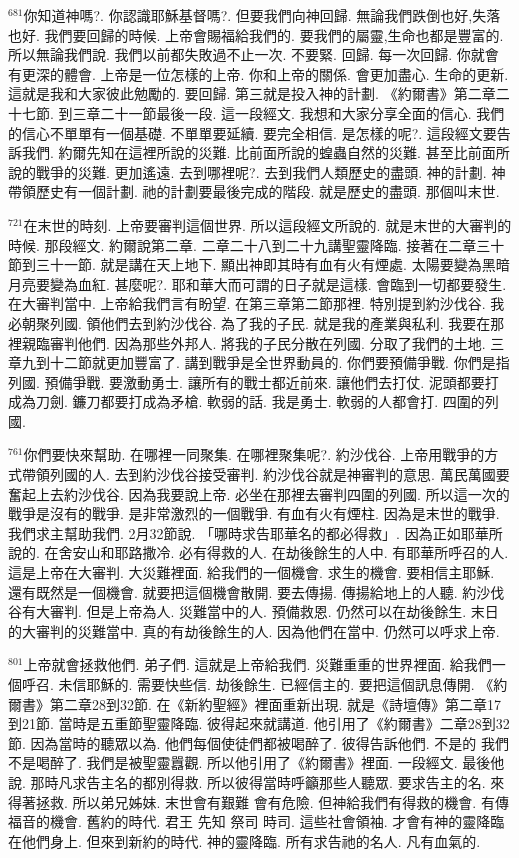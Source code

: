 \documentclass{book}
\begin{document}
$^{681}$你知道神嗎?.
你認識耶穌基督嗎?.
但要我們向神回歸.
無論我們跌倒也好,失落也好.
我們要回歸的時候.
上帝會賜福給我們的.
要我們的屬靈,生命也都是豐富的.
所以無論我們說.
我們以前都失敗過不止一次.
不要緊.
回歸.
每一次回歸.
你就會有更深的體會.
上帝是一位怎樣的上帝.
你和上帝的關係.
會更加盡心.
生命的更新.
這就是我和大家彼此勉勵的.
要回歸.
第三就是投入神的計劃.
《約爾書》第二章二十七節.
到三章二十一節最後一段.
這一段經文.
我想和大家分享全面的信心.
我們的信心不單單有一個基礎.
不單單要延續.
要完全相信.
是怎樣的呢?.
這段經文要告訴我們.
約爾先知在這裡所說的災難.
比前面所說的蝗蟲自然的災難.
甚至比前面所說的戰爭的災難.
更加遙遠.
去到哪裡呢?.
去到我們人類歷史的盡頭.
神的計劃.
神帶領歷史有一個計劃.
祂的計劃要最後完成的階段.
就是歷史的盡頭.
那個叫末世.

$^{721}$在末世的時刻.
上帝要審判這個世界.
所以這段經文所說的.
就是末世的大審判的時候.
那段經文.
約爾說第二章.
二章二十八到二十九講聖靈降臨.
接著在二章三十節到三十一節.
就是講在天上地下.
顯出神即其時有血有火有煙處.
太陽要變為黑暗月亮要變為血紅.
甚麼呢?.
耶和華大而可謂的日子就是這樣.
會臨到一切都要發生.
在大審判當中.
上帝給我們言有盼望.
在第三章第二節那裡.
特別提到約沙伐谷.
我必朝聚列國.
領他們去到約沙伐谷.
為了我的子民.
就是我的產業與私利.
我要在那裡親臨審判他們.
因為那些外邦人.
將我的子民分散在列國.
分取了我們的土地.
三章九到十二節就更加豐富了.
講到戰爭是全世界動員的.
你們要預備爭戰.
你們是指列國.
預備爭戰.
要激動勇士.
讓所有的戰士都近前來.
讓他們去打仗.
泥頭都要打成為刀劍.
鐮刀都要打成為矛槍.
軟弱的話.
我是勇士.
軟弱的人都會打.
四圍的列國.

$^{761}$你們要快來幫助.
在哪裡一同聚集.
在哪裡聚集呢?.
約沙伐谷.
上帝用戰爭的方式帶領列國的人.
去到約沙伐谷接受審判.
約沙伐谷就是神審判的意思.
萬民萬國要奮起上去約沙伐谷.
因為我要說上帝.
必坐在那裡去審判四圍的列國.
所以這一次的戰爭是沒有的戰爭.
是非常激烈的一個戰爭.
有血有火有煙柱.
因為是末世的戰爭.
我們求主幫助我們.
2月32節說.
「哪時求告耶華名的都必得救」.
因為正如耶華所說的.
在舍安山和耶路撒冷.
必有得救的人.
在劫後餘生的人中.
有耶華所呼召的人.
這是上帝在大審判.
大災難裡面.
給我們的一個機會.
求生的機會.
要相信主耶穌.
還有既然是一個機會.
就要把這個機會散開.
要去傳揚.
傳揚給地上的人聽.
約沙伐谷有大審判.
但是上帝為人.
災難當中的人.
預備救恩.
仍然可以在劫後餘生.
末日的大審判的災難當中.
真的有劫後餘生的人.
因為他們在當中.
仍然可以呼求上帝.

$^{801}$上帝就會拯救他們.
弟子們.
這就是上帝給我們.
災難重重的世界裡面.
給我們一個呼召.
未信耶穌的.
需要快些信.
劫後餘生.
已經信主的.
要把這個訊息傳開.
《約爾書》第二章28到32節.
在《新約聖經》裡面重新出現.
就是《詩壇傳》第二章17到21節.
當時是五重節聖靈降臨.
彼得起來就講道.
他引用了《約爾書》二章28到32節.
因為當時的聽眾以為.
他們每個使徒們都被喝醉了.
彼得告訴他們.
不是的 我們不是喝醉了.
我們是被聖靈囂觀.
所以他引用了《約爾書》裡面.
一段經文.
最後他說.
那時凡求告主名的都別得救.
所以彼得當時呼籲那些人聽眾.
要求告主的名.
來得著拯救.
所以弟兄姊妹.
末世會有艱難 會有危險.
但神給我們有得救的機會.
有傳福音的機會.
舊約的時代.
君王 先知 祭司 時司.
這些社會領袖.
才會有神的靈降臨在他們身上.
但來到新約的時代.
神的靈降臨.
所有求告祂的名人.
凡有血氣的.
\end{document}
